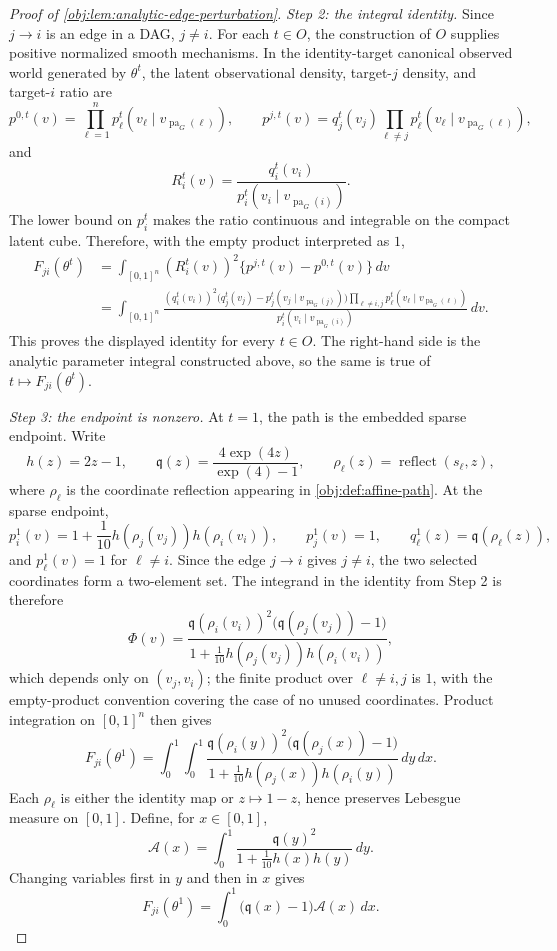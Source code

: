 \documentclass[11pt]{article}
\begin{document}
\begin{proof}[Proof of \cref{obj:lem:analytic-edge-perturbation}]
\emph{Step 2: the integral identity.}
Since \(j\to i\) is an edge in a DAG, \(j\ne i\).  For each \(t\in O\), the construction of \(O\) supplies positive normalized smooth mechanisms.  In the identity-target canonical observed world generated by \(\theta^t\), the latent observational density, target-\(j\) density, and target-\(i\) ratio are
\[
p^{0,t}(v)=\prod_{\ell=1}^n p_\ell^t(v_\ell\mid v_{\operatorname{pa}_G(\ell)}),
\qquad
p^{j,t}(v)=q_j^t(v_j)\prod_{\ell\ne j}p_\ell^t(v_\ell\mid v_{\operatorname{pa}_G(\ell)}),
\]
and
\[
R_i^t(v)=\frac{q_i^t(v_i)}
{p_i^t(v_i\mid v_{\operatorname{pa}_G(i)})}.
\]
The lower bound on \(p_i^t\) makes the ratio continuous and integrable on the compact latent cube.  Therefore, with the empty product interpreted as \(1\),
\[
\begin{aligned}
F_{ji}(\theta^t)
&=\int_{[0,1]^n}(R_i^t(v))^2\{p^{j,t}(v)-p^{0,t}(v)\}\,dv\\
&=\int_{[0,1]^n}
\frac{(q_i^t(v_i))^2
\bigl(q_j^t(v_j)-p_j^t(v_j\mid v_{\operatorname{pa}_G(j)})\bigr)
\prod_{\ell\ne i,j}p_\ell^t(v_\ell\mid v_{\operatorname{pa}_G(\ell)})}
{p_i^t(v_i\mid v_{\operatorname{pa}_G(i)})}\,dv .
\end{aligned}
\]
This proves the displayed identity for every \(t\in O\).  The right-hand side is the analytic parameter integral constructed above, so the same is true of \(t\mapsto F_{ji}(\theta^t)\). %

\emph{Step 3: the endpoint is nonzero.}
At \(t=1\), the path is the embedded sparse endpoint.  Write
\[
h(z)=2z-1,
\qquad
\mathfrak q(z)=\frac{4\exp(4z)}{\exp(4)-1},
\qquad
\rho_\ell(z)=\operatorname{reflect}(s_\ell,z),
\]
where \(\rho_\ell\) is the coordinate reflection appearing in \cref{obj:def:affine-path}.  At the sparse endpoint,
\[
p_i^1(v)=1+\frac{1}{10}h(\rho_j(v_j))h(\rho_i(v_i)),
\qquad
p_j^1(v)=1,
\qquad
q_\ell^1(z)=\mathfrak q(\rho_\ell(z)),
\]
and \(p_\ell^1(v)=1\) for \(\ell\ne i\).  Since the edge \(j\to i\) gives \(j\ne i\), the two selected coordinates form a two-element set.  The integrand in the identity from Step 2 is therefore
\[
\Phi(v)=
\frac{\mathfrak q(\rho_i(v_i))^2\bigl(\mathfrak q(\rho_j(v_j))-1\bigr)}
{1+\frac{1}{10}h(\rho_j(v_j))h(\rho_i(v_i))},
\]
which depends only on \((v_j,v_i)\); the finite product over \(\ell\ne i,j\) is \(1\), with the empty-product convention covering the case of no unused coordinates.  Product integration on \([0,1]^n\) then gives
\[
F_{ji}(\theta^1)
=\int_0^1\!\int_0^1
\frac{\mathfrak q(\rho_i(y))^2\bigl(\mathfrak q(\rho_j(x))-1\bigr)}
{1+\frac{1}{10}h(\rho_j(x))h(\rho_i(y))}\,dy\,dx .
\]
Each \(\rho_\ell\) is either the identity map or \(z\mapsto1-z\), hence preserves Lebesgue measure on \([0,1]\).  Define, for \(x\in[0,1]\),
\[
\mathcal A(x)=\int_0^1
\frac{\mathfrak q(y)^2}
{1+\frac{1}{10}h(x)h(y)}\,dy .
\]
Changing variables first in \(y\) and then in \(x\) gives
\[
F_{ji}(\theta^1)
=\int_0^1 \bigl(\mathfrak q(x)-1\bigr)\mathcal A(x)\,dx .
\]


\end{proof}
\end{document}
